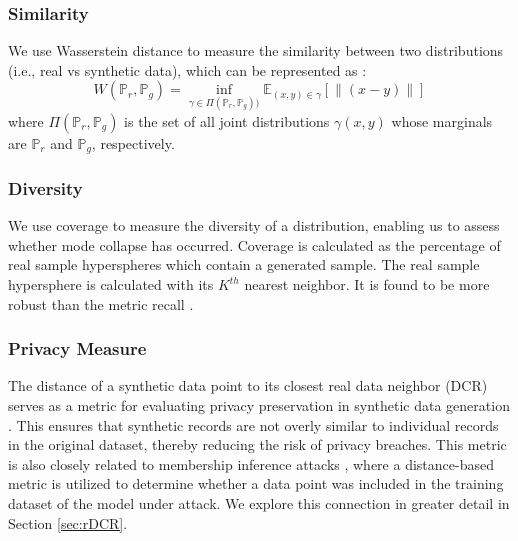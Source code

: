 \subsubsection{Similarity}

We use Wasserstein distance to measure the similarity between two distributions (i.e., real vs synthetic data), which can be represented as \cite{WGAN}:
\begin{equation}
    W(\mathbb{P}_r,\mathbb{P}_g)=\inf_{\gamma\in\Pi(\mathbb{P}_r,\mathbb{P}_g))}\mathbb{E}_{(x,y)\in\gamma}[\|(x-y)\|]
\end{equation}
where $\Pi(\mathbb{P}_r,\mathbb{P}_g)$ is the set of all joint distributions $\gamma(x,y)$ whose marginals are $\mathbb{P}_r$ and $\mathbb{P}_g$, respectively.

\subsubsection{Diversity} We use coverage \cite{coverage} to measure the diversity of a distribution, enabling us to assess whether mode collapse \cite{GAN} has occurred. Coverage is calculated as the percentage of real sample hyperspheres which contain a generated sample. The real sample hypersphere is calculated with its $K^{th}$ nearest neighbor. It is found to be more robust than the metric recall \cite{improved_precision_recall, thompson2022evaluation}.

\subsubsection{Privacy Measure} \label{sec:dcr}
The distance of a synthetic data point to its closest real data neighbor (DCR) serves as a metric for evaluating privacy preservation in synthetic data generation \cite{dcr_renmin, ctab-gan}. This ensures that synthetic records are not overly similar to individual records in the original dataset, thereby reducing the risk of privacy breaches.
This metric is also closely related to membership inference attacks \cite{membership_MIA}, where a distance-based metric \cite{hilprecht2019_gan_attack} is utilized to determine whether a data point was included in the training dataset of the model under attack. We explore this connection in greater detail in Section \ref{sec:rDCR}.